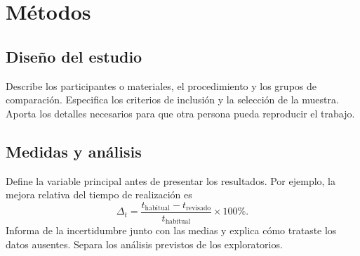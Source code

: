 \section{Métodos}
\subsection{Diseño del estudio}
Describe los participantes o materiales, el procedimiento y los grupos de comparación.
Especifica los criterios de inclusión y la selección de la muestra. Aporta los
detalles necesarios para que otra persona pueda reproducir el trabajo.
\subsection{Medidas y análisis}
Define la variable principal antes de presentar los resultados. Por ejemplo,
la mejora relativa del tiempo de realización es
\begin{equation}
\Delta_t = \frac{t_{\mathrm{habitual}}-t_{\mathrm{revisado}}}{t_{\mathrm{habitual}}}\times100\%.
\label{eq:improvement}
\end{equation}
Informa de la incertidumbre junto con las medias y explica cómo trataste los
datos ausentes. Separa los análisis previstos de los exploratorios.

